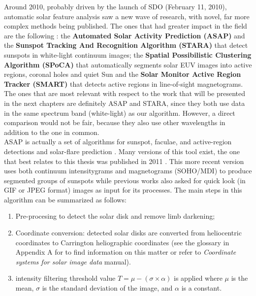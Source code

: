 Around 2010, probably driven by the launch of SDO (February 11, 2010), automatic solar feature analysis saw a new wave of research, with novel, far more complex methods being published. The ones that had greater impact in the field are the following \cite{verbeeck2013multi}: the \textbf{Automated Solar Activity Prediction (ASAP)} and the \textbf{Sunspot Tracking And Recognition Algorithm (STARA)} \cite{watson2009modelling} that detect sunspots in white-light continuum images; the \textbf{Spatial Possibilistic Clustering Algorithm (SPoCA)}  \cite{barra2009fast} that automatically segments solar EUV images into active regions, coronal holes and quiet Sun  and the \textbf{Solar Monitor Active Region Tracker (SMART)} \cite{higgins2011solar} that detects active regions in line-of-sight magnetograms. The ones that are most relevant with respect to the work that will be presented in the next chapters are definitely ASAP and STARA, since they both use data in the same spectrum band (white-light) as our algorithm. However, a direct comparison would not be fair, because they also use other wavelengths in addition to the one in common.\\
ASAP is actually a set of algorithms for sunspot, faculae, and active-region detections \cite{colak2008automated} and solar-flare prediction \cite{colak2009automated}. Many versions of this tool exist, the one that best relates to this thesis  was published in 2011 \cite{colak2011representation}. This more recent version uses both continuum intensitygrams and magnetograms (SOHO/MDI) to produce segmented groups of sunspots while previous works also asked for quick look (in GIF or JPEG format) images as input for its processes. The main steps in this algorithm can be summarized as follows:
\begin{enumerate}
  \item Pre-procesing to detect the solar disk and remove limb darkening;
  \item Coordinate conversion: detected solar disks are converted from heliocentric coordinates to Carrington heliographic coordinates (see the glossary in Appendix A for to find information on this matter or refer to \textit{Coordinate systems for solar image data} \cite{thompson2006coordinate} manual).
  \item intensity filtering threshold value $T = \mu - (\sigma \times \alpha)$ is applied where $\mu$ is the mean, $\sigma$ is the standard deviation of the image, and $\alpha$ is a constant.
\end{enumerate}
